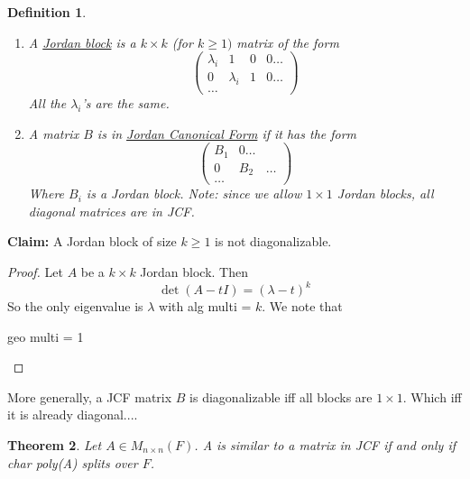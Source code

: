 \documentclass{article}
\newtheorem{theorem}{Theorem}[section]
\newtheorem{definition}[theorem]{Definition}
\newtheorem{one minute paper}[theorem]{One Minute Paper}
\begin{document}
\begin{definition}
    \begin{enumerate}
        \item A \underline{Jordan block} is a $k \times k$ (for $k \geq 1)$ matrix of the form 
        \begin{equation}
            \begin{pmatrix}
                \lambda_i & 1 & 0 & 0 \dots \\
                0 & \lambda_i & 1 & 0 \dots \\
                \dots 
            \end{pmatrix}
        \end{equation}
        All the $\lambda_i$'s are the same. 
        \item A matrix $B$ is in \underline{Jordan Canonical Form} if it has the form 
        \begin{equation}
            \begin{pmatrix}
                B_1 & 0 \dots \\
                0 & B_2 & \dots \\
                \dots 
            \end{pmatrix}
        \end{equation}
        Where $B_i$ is a Jordan block. Note: since we allow $1 \times 1$ Jordan blocks, all diagonal matrices are in JCF.  
    \end{enumerate}
\end{definition}
\begin{center}
    \textbf{Claim:} A Jordan block of size $k \geq 1$ is not diagonalizable. 
\end{center}
\begin{proof}
    Let $A$ be a $k\times k$ Jordan block. Then 
    \begin{equation}
        \det(A - tI) = (\lambda - t)^k
    \end{equation}
    So the only eigenvalue is $\lambda$ with alg multi = $k$. We note that
    \begin{center}
        geo multi = 1
    \end{center}
\end{proof}

More generally, a JCF matrix $B$ is diagonalizable iff all blocks are $1 \times 1$. Which iff it is already diagonal....

\begin{theorem}
    Let $A \in M_{n \times n}(F)$. A is similar to a matrix in JCF if and only if char poly(A) splits over $F$. 
\end{theorem}
\end{document}
